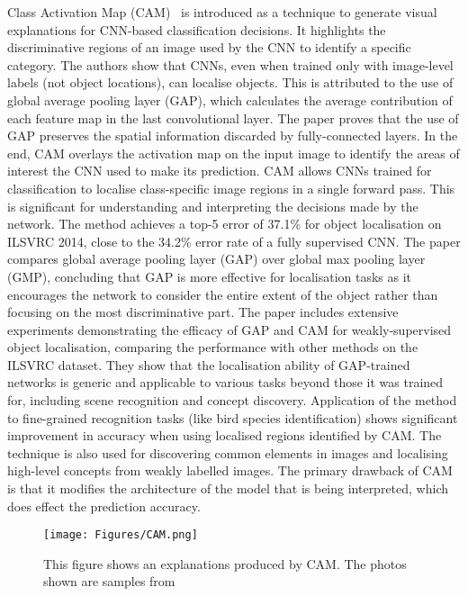 Class Activation Map (CAM)~\cite{ZhouKLOT16} is introduced as a technique to generate visual explanations for CNN-based classification decisions. It highlights the discriminative regions of an image used by the CNN to identify a specific category. The authors show that CNNs, even when trained only with image-level labels (not object locations), can localise objects. This is attributed to the use of global average pooling layer (GAP), which calculates the average contribution of each feature map in the last convolutional layer. The paper proves that the use of GAP preserves the spatial information discarded by fully-connected layers. In the end, CAM overlays the activation map on the input image to identify the areas of interest the CNN used to make its prediction. CAM allows CNNs trained for classification to localise class-specific image regions in a single forward pass. This is significant for understanding and interpreting the decisions made by the network. The method achieves a top-5 error of 37.1\% for object localisation on ILSVRC 2014, close to the 34.2\% error rate of a fully supervised CNN. The paper compares global average pooling layer (GAP) over global max pooling layer (GMP), concluding that GAP is more effective for localisation tasks as it encourages the network to consider the entire extent of the object rather than focusing on the most discriminative part. The paper includes extensive experiments demonstrating the efficacy of GAP and CAM for weakly-supervised object localisation, comparing the performance with other methods on the ILSVRC dataset. They show that the localisation ability of GAP-trained networks is generic and applicable to various tasks beyond those it was trained for, including scene recognition and concept discovery. Application of the method to fine-grained recognition tasks (like bird species identification) shows significant improvement in accuracy when using localised regions identified by CAM. The technique is also used for discovering common elements in images and localising high-level concepts from weakly labelled images. The primary drawback of CAM is that it modifies the architecture of the model that is being interpreted, which does effect the prediction accuracy.

\begin{figure}[ht!]
	\begin{center}
		\texttt{[image: Figures/CAM.png]}
	\end{center}
	\caption{This figure shows an explanations produced by CAM. The photos shown are samples from~\cite{ZhouKLOT16}}
	\label{Fig:VAE}
\end{figure} 

